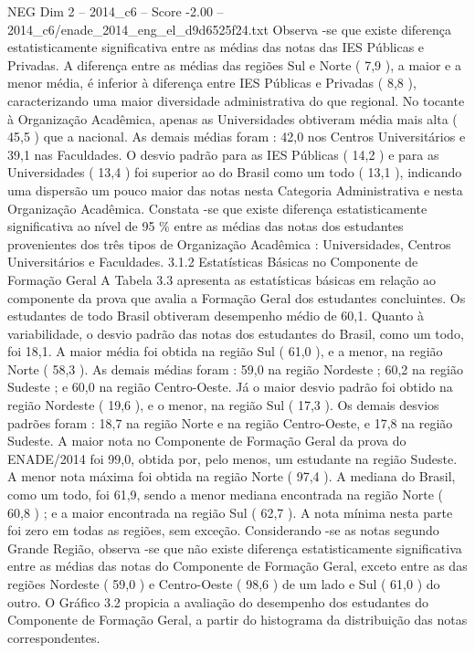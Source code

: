 \begin{textsample}{NEG Dim 2 – 2014\_c6 – Score -2.00 – 2014\_c6/enade\_2014\_eng\_el\_d9d6525f24.txt}
Observa -se que existe diferença estatisticamente significativa entre as médias das notas das IES Públicas e Privadas.
A diferença entre as médias das regiões Sul e Norte ( 7,9 ), a maior e a menor média, é inferior à diferença entre IES Públicas e Privadas ( 8,8 ), caracterizando uma maior diversidade administrativa do que regional.
No tocante à Organização Acadêmica, apenas as Universidades obtiveram média mais alta ( 45,5 ) que a nacional.
As demais médias foram : 42,0 nos Centros Universitários e 39,1 nas Faculdades.
O desvio padrão para as IES Públicas ( 14,2 ) e para as Universidades ( 13,4 ) foi superior ao do Brasil como um todo ( 13,1 ), indicando uma dispersão um pouco maior das notas nesta Categoria Administrativa e nesta Organização Acadêmica.
Constata -se que existe diferença estatisticamente significativa ao nível de 95 \% entre as médias das notas dos estudantes provenientes dos três tipos de Organização Acadêmica : Universidades, Centros Universitários e Faculdades. 3.1.2 Estatísticas Básicas no Componente de Formação Geral A Tabela 3.3 apresenta as estatísticas básicas em relação ao componente da prova que avalia a Formação Geral dos estudantes concluintes.
Os estudantes de todo Brasil obtiveram desempenho médio de 60,1.
Quanto à variabilidade, o desvio padrão das notas dos estudantes do Brasil, como um todo, foi 18,1.
A maior média foi obtida na região Sul ( 61,0 ), e a menor, na região Norte ( 58,3 ).
As demais médias foram : 59,0 na região Nordeste ; 60,2 na região Sudeste ; e 60,0 na região Centro-Oeste.
Já o maior desvio padrão foi obtido na região Nordeste ( 19,6 ), e o menor, na região Sul ( 17,3 ).
Os demais desvios padrões foram : 18,7 na região Norte e na região Centro-Oeste, e 17,8 na região Sudeste.
A maior nota no Componente de Formação Geral da prova do ENADE/2014 foi 99,0, obtida por, pelo menos, um estudante na região Sudeste.
A menor nota máxima foi obtida na região Norte ( 97,4 ).
A mediana do Brasil, como um todo, foi 61,9, sendo a menor mediana encontrada na região Norte ( 60,8 ) ; e a maior encontrada na região Sul ( 62,7 ).
A nota mínima nesta parte foi zero em todas as regiões, sem exceção.
Considerando -se as notas segundo Grande Região, observa -se que não existe diferença estatisticamente significativa entre as médias das notas do Componente de Formação Geral, exceto entre as das regiões Nordeste ( 59,0 ) e Centro-Oeste ( 98,6 ) de um lado e Sul ( 61,0 ) do outro.
O Gráfico 3.2 propicia a avaliação do desempenho dos estudantes do Componente de Formação Geral, a partir do histograma da distribuição das notas correspondentes.

\end{textsample}
